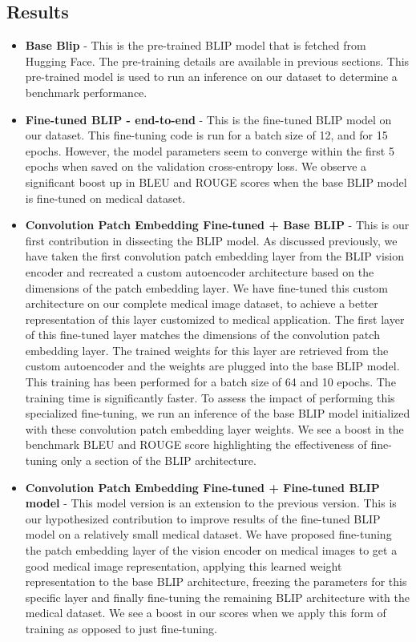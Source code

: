 \documentclass[pdflatex,sn-mathphys-num]{sn-jnl}%
\begin{document}
\subsection{Results}\label{subsec4.3}
\begin{itemize}
\item \textbf{Base Blip} - This is the pre-trained BLIP model that is fetched from Hugging Face. The pre-training details are available in previous sections. This pre-trained model is used to run an inference on our dataset to determine a benchmark performance. 

\item \textbf{Fine-tuned BLIP - end-to-end} - This is the fine-tuned BLIP model on our dataset. This fine-tuning code is run for a batch size of 12, and for 15 epochs. However, the model parameters seem to converge within the first 5 epochs when saved on the validation cross-entropy loss. We observe a significant boost up in BLEU and ROUGE scores when the base BLIP model is fine-tuned on medical dataset.

\item \textbf{Convolution Patch Embedding Fine-tuned + Base BLIP} - This is our first contribution in dissecting the BLIP model. As discussed previously, we have taken the first convolution patch embedding layer from the BLIP vision encoder and recreated a custom autoencoder architecture based on the dimensions of the patch embedding layer. We have fine-tuned this custom architecture on our complete medical image dataset, to achieve a better representation of this layer customized to medical application. The first layer of this fine-tuned layer matches the dimensions of the convolution patch embedding layer. The trained weights for this layer are retrieved from the custom autoencoder and the weights are plugged into the base BLIP model. This training has been performed for a batch size of 64 and 10 epochs. The training time is significantly faster. To assess the impact of performing this specialized fine-tuning, we run an inference of the base BLIP model initialized with these convolution patch embedding layer weights. We see a boost in the benchmark BLEU and ROUGE score highlighting the effectiveness of fine-tuning only a section of the BLIP architecture.

\item \textbf{Convolution Patch Embedding Fine-tuned + Fine-tuned BLIP model} - This model version is an extension to the previous version. This is our hypothesized contribution to improve results of the fine-tuned BLIP model on a relatively small medical dataset. We have proposed fine-tuning the patch embedding layer of the vision encoder on medical images to get a good medical image representation, applying this learned weight representation to the base BLIP architecture, freezing the parameters for this specific layer and finally fine-tuning the remaining BLIP architecture with the medical dataset. We see a boost in our scores when we apply this form of training as opposed to just fine-tuning. 


\end{itemize}
\end{document}
